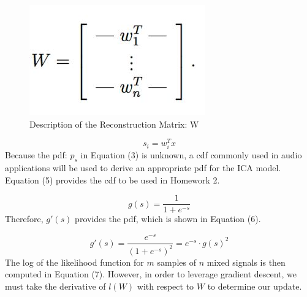 \documentclass[12pt]{article}
\begin{document}
\begin{figure}[h] %
  \centering
  \includegraphics[width = 0.2\linewidth]{yeesh.JPG}
  \caption{Description of the Reconstruction Matrix: W}
\end{figure}

\begin{equation}
    s_{i}=w_{i}^{T}x
\end{equation}
\bigbreak
\noindent
Because the pdf: \(p_{s}\) in Equation (3) is unknown, a cdf commonly used in audio applications will be used to derive an appropriate pdf for the ICA model. Equation (5) provides the cdf to be used in Homework 2.

\begin{equation}
    g(s) = \frac{1}{1+e^{-s}}
\end{equation}
\bigbreak
\noindent
Therefore, \(g'(s)\) provides the pdf, which is shown in Equation (6).

\begin{equation}
    g'(s) = \frac{e^{-s}}{(1+e^{-s})^{2}} = e^{-s}\cdot g(s)^{2}
\end{equation}
\bigbreak
\noindent
The log of the likelihood function for \(m\) samples of \(n\) mixed signals is then computed in Equation (7). However, in order to leverage gradient descent, we must take the derivative of \(l(W)\) with respect to \(W\) to determine our update.
\end{document}
